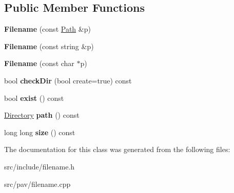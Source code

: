 \subsection*{Public Member Functions}
\begin{DoxyCompactItemize}
\item 
\mbox{\label{classupc_1_1Filename_a80bdd15a0d0da8cf97a59125c3cae2c9}} 
{\bfseries Filename} (const \hyperlink{classupc_1_1Path}{Path} \&p)
\item 
\mbox{\label{classupc_1_1Filename_a13e550c5b28bf991c84c053035760ed4}} 
{\bfseries Filename} (const string \&p)
\item 
\mbox{\label{classupc_1_1Filename_a005b26738aa7db3b9f89258600b1e6f3}} 
{\bfseries Filename} (const char $\ast$p)
\item 
\mbox{\label{classupc_1_1Filename_a05b25a82d938ded560351a13ddea3879}} 
bool {\bfseries check\+Dir} (bool create=true) const
\item 
\mbox{\label{classupc_1_1Filename_a6328d5ecc92b9dd4ca15a6cd0390dceb}} 
bool {\bfseries exist} () const
\item 
\mbox{\label{classupc_1_1Filename_ac7146f108eedbbf0bf73f54bbe6754f7}} 
\hyperlink{classupc_1_1Directory}{Directory} {\bfseries path} () const
\item 
\mbox{\label{classupc_1_1Filename_a196cf2ea31fa9884b8627696d3e27c04}} 
long long {\bfseries size} () const
\end{DoxyCompactItemize}


The documentation for this class was generated from the following files\+:\begin{DoxyCompactItemize}
\item 
src/include/filename.\+h\item 
src/pav/filename.\+cpp\end{DoxyCompactItemize}
